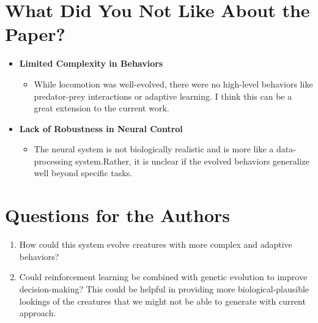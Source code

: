 \documentclass[12pt]{article}
\begin{document}
\section{What Did You Not Like About the Paper?}
\begin{itemize}[noitemsep]
    \item \textbf{Limited Complexity in Behaviors}
    \begin{itemize}[noitemsep]
        \item While locomotion was well-evolved, there were no high-level behaviors like predator-prey interactions or adaptive learning. I think this can be a great extension to the current work.
    \end{itemize}
    \item \textbf{Lack of Robustness in Neural Control}
    \begin{itemize}[noitemsep]
        \item The neural system is not biologically realistic and is more like a data-processing system.Rather, it is unclear if the evolved behaviors generalize well beyond specific tasks.
    \end{itemize}
\end{itemize}

\section{Questions for the Authors}
\begin{enumerate}[noitemsep]
    \item How could this system evolve creatures with more complex and adaptive behaviors?
    \item Could reinforcement learning be combined with genetic evolution to improve decision-making? This could be helpful in providing more biological-plausible lookings of the creatures that we might not be able to generate with current approach.
\end{enumerate}
\end{document}
